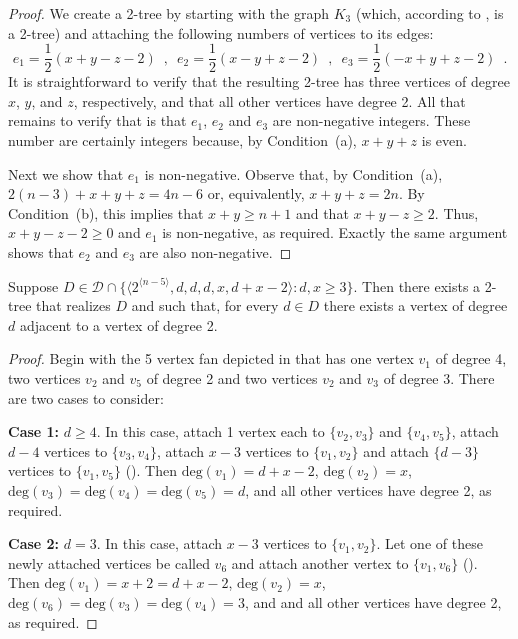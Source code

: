 \documentclass[lotsofwhite,charterfonts]{patmorin}
\newcommand{\rep}[1]{^{\langle#1\rangle}}
\newcommand{\degreesum}{Condition~(a)}
\newcommand{\maxdegree}{Condition~(b)}
\newcommand{\degree}{\mathrm{deg}}
\begin{document}
\begin{proof}
We create a 2-tree by starting with the graph $K_3$ (which, according
to , is a
2-tree) and attaching the following numbers of vertices to its edges:
\[
    e_1=\frac{1}{2}(x+y-z-2) \enspace , \enspace
    e_2=\frac{1}{2}(x-y+z-2) \enspace , \enspace 
    e_3=\frac{1}{2}(-x+y+z-2) \enspace .
\]
It is straightforward to verify that the resulting 2-tree has three
vertices of degree $x$, $y$, and $z$, respectively, and that all other
vertices have degree 2.  All that remains to verify that is that
$e_1$, $e_2$ and $e_3$ are non-negative integers.  These number are
certainly integers because, by \degreesum, $x+y+z$ is even.  

Next we show that $e_1$ is non-negative.  Observe that, by \degreesum,
$2(n-3)+x+y+z = 4n-6$ or, equivalently, $x+y+z=2n$.  By \maxdegree,
this implies that $x+y \ge n+1$ and that $x+y-z \ge 2$.  Thus,
$x+y-z-2 \ge 0$ and $e_1$ is non-negative, as required.  
Exactly the same argument shows that $e_2$ and $e_3$ are also
non-negative.
\end{proof}

\begin{lem}
Suppose $D\in \mathcal{D}\cap \{\langle 2\rep{n-5},d,d,d,x,d+x-2 \rangle:
\mbox{$d,x\ge 3$}\}$.
Then there exists a 2-tree that realizes $D$ and such that, for every
$d\in D$ there exists a vertex of degree $d$ adjacent to a vertex of
degree 2.
\end{lem}

\begin{proof}
Begin with the 5 vertex fan depicted in  that has
one vertex $v_1$ of degree 4, two vertices $v_2$ and $v_5$ of degree 2
and two vertices $v_2$ and $v_3$ of degree 3.  There are two cases to
consider:

\noindent\textbf{Case 1:} $d\ge 4$.  In this case, attach 1 vertex
each to $\{v_2,v_3\}$ and $\{v_4,v_5\}$, attach $d-4$ vertices to
$\{v_3,v_4\}$, attach $x-3$ vertices to $\{v_1,v_2\}$ and attach
$\{d-3\}$ vertices to $\{v_1,v_5\}$ ().  Then
$\degree(v_1)=d+x-2$, $\degree(v_2)=x$,
$\degree(v_3)=\degree(v_4)=\degree(v_5)=d$, and all other vertices
have degree 2, as required.

\noindent\textbf{Case 2:} $d=3$.  In this case, attach $x-3$ vertices
to $\{v_1,v_2\}$.  Let one of these newly attached vertices be called
$v_6$ and attach another vertex to $\{v_1,v_6\}$
().  Then $\degree(v_1)=x+2=d+x-2$,
$\degree(v_2)=x$, $\degree(v_6)=\degree(v_3)=\degree(v_4)=3$, and and
all other vertices have degree 2, as required. 
\end{proof}
\end{document}

